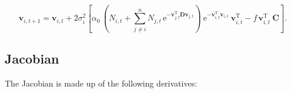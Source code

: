 \begin{equation} \label{eq:axes-change-full}
    \mathbf{v}_{i,t+1} = \mathbf{v}_{i,t} + 2 \sigma_i^2
    \left[
        \alpha_0 \, \left(
            N_{i,t} +
            \sum_{j \ne i}^{n}{ N_{j,t} \, \textrm{e}^{
            - \mathbf{v}_{j,t}^{\textrm{T}}
            \mathbf{D} \mathbf{v}_{j,t} } }
        \right) \:
            \textrm{e}^{- \mathbf{v}_{i,t}^{\textrm{T}} \mathbf{v}_{i,t}} \:
            \mathbf{v}_{i,t}^{\textrm{T}}
        - f \, \mathbf{v}_{i,t}^{\textrm{T}} \: \mathbf{C}
    \right]
    \textrm{.}
\end{equation}


\subsection*{Jacobian}

The Jacobian is made up of the following derivatives:

